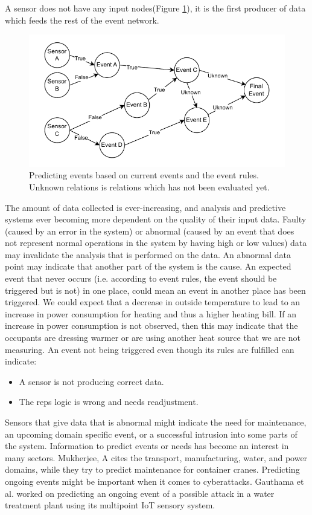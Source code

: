 \documentclass[a4paper,8pt]{article}
\begin{document}
		A sensor does not have any input nodes(Figure \ref{fig:prediction}), it is the first producer of data which feeds the rest of the event network.
		\begin{figure}[!h]
			\centering
			\includegraphics[width=.9\textwidth]{Events}
			\caption{Predicting events based on current events and the event rules. Unknown relations is relations which has not been evaluated yet.}
			\label{fig:prediction}
		\end{figure}
		
		The amount of data collected is ever-increasing, and analysis and predictive systems ever becoming more dependent on the quality of their input data. Faulty (caused by an error in the system) or abnormal (caused by an event that does not represent normal operations in the system by having high or low values) data may invalidate the analysis that is performed on the data. An abnormal data point may indicate that another part of the system is the cause.
		An expected event that never occurs (i.e. according to event rules, the event should be triggered but is not) in one place, could mean an event in another place has been triggered. We could expect that a decrease in outside temperature to lead to an increase in power consumption for heating and thus a higher heating bill. If an increase in power consumption is not observed, then this may indicate that the occupants are dressing warmer or are using another heat source that we are not measuring. An event not being triggered even though its rules are fulfilled can indicate:
		\begin{itemize}
			\item A sensor is not producing correct data.
			\item The \gls{reps} logic is wrong and needs readjustment.
		\end{itemize}
		
		Sensors that give data that is abnormal might indicate the need for maintenance\cite{MUKHERJEE2024102444}, an upcoming domain specific event, or a successful intrusion into some parts of the system\cite{MR2022103046}. Information to predict events or needs has become an interest in many sectors. Mukherjee, A\cite{MUKHERJEE2024102444} cites the transport, manufacturing, water, and power domains, while they try to predict maintenance for container cranes. Predicting ongoing events might be important when it comes to cyberattacks. Gauthama et al. worked on predicting an ongoing event of a possible attack in a water treatment plant using its multipoint IoT sensory system\cite{MR2022103046}.
		
\end{document}
